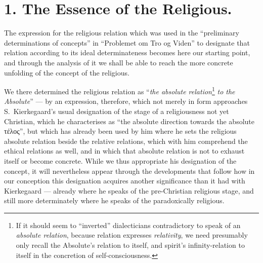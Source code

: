 \documentclass[12pt,a4paper]{book}
\begin{document}
\setcounter{footnote}{0}%
\section*{1. The Essence of the Religious.}

The expression for the religious relation which was used in the ``preliminary
determinations of concepts'' in ``Problemet om Tro og Viden'' to designate that
relation according to its ideal determinateness becomes here our starting
point, and through the analysis of it we shall be able to reach the more
concrete unfolding of the concept of the religious.

We there determined the religious relation as ``\emph{the absolute
relation}\footnote{If it should seem to ``inverted'' dialecticians
contradictory to speak of an \emph{absolute relation}, because relation
expresses \emph{relativity}, we need presumably only recall the Absolute's
relation to itself, and spirit's infinity-relation to itself in the concretion
of self-consciousness.} \emph{to the Absolute}'' --- by an expression,
therefore, which not merely in form approaches S.\ Kierkegaard's usual
designation of the stage of a religiousness not yet Christian, which he
characterises as ``the absolute direction towards the absolute τέλος'', but
which has already been used by him where he sets the religious absolute
relation beside the relative relations, which with him comprehend the ethical
relations as well, and in which that absolute relation is not to exhaust
itself or become concrete. While we thus appropriate his
designation of the concept, it will nevertheless appear through the
developments that follow how in our conception this designation acquires
another significance than it had with Kierkegaard --- already where he speaks
of the pre-Christian religious stage, and still more determinately where he
speaks of the paradoxically religious.
\end{document}
